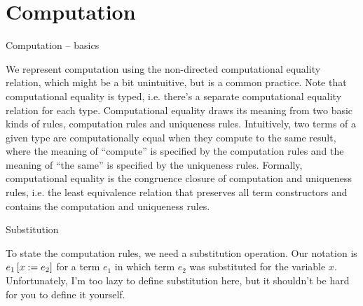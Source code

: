 \documentclass{beamer}
\begin{document}
\section{Computation}

\begin{frame}{Computation -- basics}

We represent computation using the non-directed computational equality relation, which might be a bit unintuitive, but is a common practice. Note that computational equality is typed, i.e. there's a separate computational equality relation for each type. Computational equality draws its meaning from two basic kinds of rules, computation rules and uniqueness rules. Intuitively, two terms of a given type are computationally equal when they compute to the same result, where the meaning of ``compute'' is specified by the computation rules and the meaning of ``the same'' is specified by the uniqueness rules. Formally, computational equality is the congruence closure of computation and uniqueness rules, i.e. the least equivalence relation that preserves all term constructors and contains the computation and uniqueness rules.

\end{frame}

\begin{frame}{Substitution}

To state the computation rules, we need a substitution operation. Our notation is $e_1\left[x := e_2\right]$ for a term $e_1$ in which term $e_2$ was substituted for the variable $x$. Unfortunately, I'm too lazy to define substitution here, but it shouldn't be hard for you to define it yourself.

\end{frame}
\end{document}
